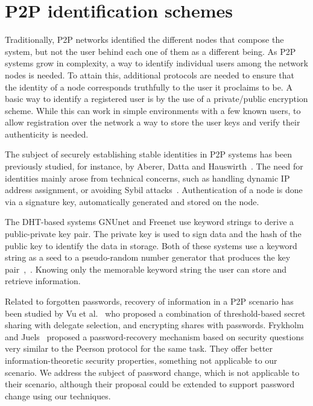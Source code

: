 \section{P2P identification schemes}

Traditionally, P2P networks identified the different nodes that compose the
system, but not the user behind each one of them as a different being.
 As P2P systems grow in complexity, a way to identify individual users among the
network nodes is needed. To attain this, additional protocols are needed to
ensure that the identity of a node corresponds truthfully to the user it
proclaims to be. A basic way to identify a registered user is by the use of
a private/public encryption scheme. While this can work in simple environments
with a few known users, to allow registration over the network a way to store
the user keys and verify their authenticity is needed.

The subject of securely establishing stable identities in P2P
systems has been previously studied, for instance, by Aberer,
Datta and Hauswirth~\cite{1318567}. The need for identities mainly arose
from technical concerns, such as handling dynamic IP address
assignment, or avoiding Sybil attacks~\cite{the_sybil_attack}. Authentication of a
node is done via a signature key, automatically generated and
stored on the node.


The DHT-based systems GNUnet
and Freenet use keyword strings to derive a public-private key
pair. The private key is used to sign data and the hash of
the public key to identify the data in storage. Both of
these systems use a keyword string as a seed to a pseudo-random number
generator that produces the key pair~\cite{clarke2010private},~\cite{Bennett03anencoding}.
Knowing only the memorable keyword string the user can
store and retrieve information.

Related to forgotten passwords, recovery of information in a
P2P scenario has been studied by Vu et al.~\cite{5380695} who proposed
a combination of threshold-based secret sharing with delegate
selection, and encrypting shares with passwords.
Frykholm and Juels~\cite{Frykholm:2001:EPR:501983.501985} proposed a password-recovery
mechanism based on security questions very similar to the Peerson protocol for
the same task. They offer better information-theoretic security properties, something not applicable to our
scenario. We address the subject of password change, which is not applicable to
their scenario, although their proposal could be extended to support password
change using our techniques.

